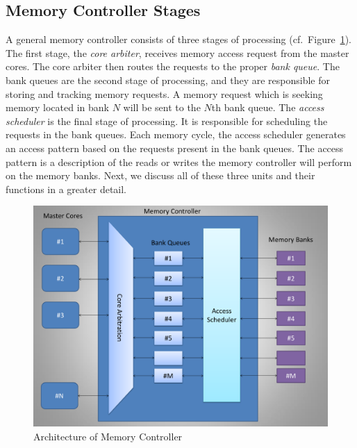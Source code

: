 \subsection{Memory Controller Stages}
A general memory controller consists of three stages of processing (cf.~Figure~\ref{fig:pseudo-code}). The first stage, the {\em core arbiter}, receives memory access request from the master cores. The core arbiter then routes the requests to the proper {\em bank queue}. The bank queues are the second stage of processing, and they are responsible for storing and tracking memory requests. A memory request which is seeking memory located in bank $N$ will be sent to the $N$th bank queue. The {\em access scheduler} is the final stage of processing. It is responsible for scheduling the requests in the bank queues. Each memory cycle, the access scheduler generates an access pattern based on the requests present in the bank queues. The access pattern is a description of the reads or writes the memory controller will perform on the memory banks. Next, we discuss all of these three units and their functions in a greater detail.
\begin{figure}[htbp]
\centering
	\includegraphics[width=0.7\linewidth]{fig/controllerArchitecture.pdf}
\caption{
{Architecture of Memory Controller} }
\label{fig:pseudo-code}
\end{figure}
